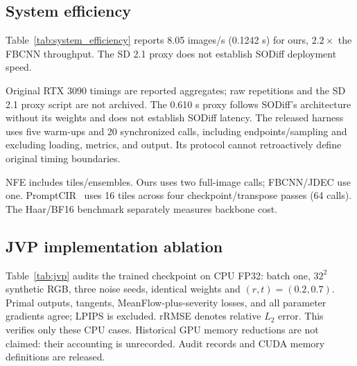 \documentclass[conference,letterpaper]{IEEEtran}
\begin{document}
\subsection{System efficiency}

Table~\ref{tab:system_efficiency} reports 8.05 images/s (0.1242 s) for ours, $2.2\times$ the FBCNN throughput. The SD 2.1 proxy does not establish SODiff deployment speed.

\begin{table}[H]
\centering
\scriptsize
\setlength{\tabcolsep}{3pt}
\renewcommand{\arraystretch}{0.85}
\caption{Reported RTX 3090 batch-one $1024^2$ efficiency. SD 2.1 proxy$^\dagger$ reconstructs the SODiff architecture without its weights; other rows time restoration systems. NFE includes tiles and ensembles.}
\label{tab:system_efficiency}
\end{table}

Original RTX 3090 timings are reported aggregates; raw repetitions and the SD 2.1 proxy script are not archived. The 0.610 s proxy follows SODiff's architecture without its weights and does not establish SODiff latency. The released harness uses five warm-ups and 20 synchronized calls, including endpoints/sampling and excluding loading, metrics, and output. Its protocol cannot retroactively define original timing boundaries.

NFE includes tiles/ensembles. Ours uses two full-image calls; FBCNN/JDEC use one. PromptCIR~\cite{li2024promptcir} uses 16 tiles across four checkpoint/transpose passes (64 calls). The Haar/BF16 benchmark separately measures backbone cost.

\subsection{JVP implementation ablation}
\label{sec:jvp_ablation}
Table~\ref{tab:jvp} audits the trained checkpoint on CPU FP32: batch one, $32^2$ synthetic RGB, three noise seeds, identical weights and $(r,t)=(0.2,0.7)$. Primal outputs, tangents, MeanFlow-plus-severity losses, and all parameter gradients agree; LPIPS is excluded. rRMSE denotes relative $L_2$ error. This verifies only these CPU cases. Historical GPU memory reductions are not claimed: their accounting is unrecorded. Audit records and CUDA memory definitions are released.
\end{document}
